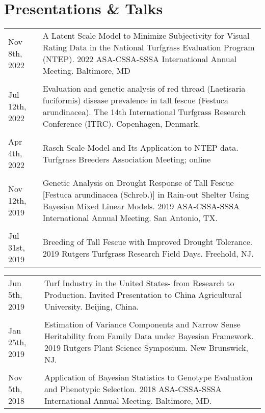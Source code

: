 \documentclass[letterpaper,11pt, english]{article}
\begin{document}
\section{Presentations \& Talks}
\begin{flushleft}
  \begin{tabularx}{\textwidth}{@{}lX@{}}
    Nov 8th, 2022 \hspace{3cm} & A Latent Scale Model to Minimize Subjectivity for Visual Rating Data in the National Turfgrass Evaluation Program (NTEP). 2022 ASA-CSSA-SSSA International Annual Meeting. Baltimore, MD \\
    \\[-0.2cm] 
    Jul 12th, 2022 \hspace{3cm} & Evaluation and genetic analysis of red thread (Laetisaria fuciformis) disease prevalence in tall fescue (Festuca arundinacea). The 14th International Turfgrass Research Conference (ITRC). Copenhagen, Denmark. \\
    \\[-0.2cm]
    Apr 4th, 2022 \hspace{3cm} & Rasch Scale Model and Its Application to NTEP data. Turfgrass Breeders Association Meeting; online \\
    \\[-0.2cm]
    Nov 12th, 2019 \hspace{3cm} & Genetic Analysis on Drought Response of Tall Fescue [Festuca arundinacea (Schreb.)] in Rain-out Shelter Using Bayesian Mixed Linear Models. 2019 ASA-CSSA-SSSA International Annual Meeting. San Antonio, TX. \\
    \\[-0.2cm]
    Jul 31st, 2019 \hspace{3cm} & Breeding of Tall Fescue with Improved Drought Tolerance. 2019 Rutgers Turfgrass Research Field Days. Freehold, NJ. \\
  \end{tabularx}
\end{flushleft}
\begin{flushleft}
    \begin{tabularx}{\textwidth}{@{}lX@{}}
    Jun 5th, 2019 \hspace{3cm} & Turf Industry in the United States- from Research to Production. Invited Presentation to China Agricultural University. Beijing, China. \\
    \\[-0.2cm]
    Jan 25th, 2019 \hspace{3cm} & Estimation of Variance Components and Narrow Sense Heritability from Family Data under Bayesian Framework. 2019 Rutgers Plant Science Symposium. New Brunswick, NJ. \\
    \\[-0.2cm]
    Nov 5th, 2018 \hspace{3cm} & Application of Bayesian Statistics to Genotype Evaluation and Phenotypic Selection. 2018 ASA-CSSA-SSSA International Annual Meeting. Baltimore, MD. \\
  \end{tabularx}
\end{flushleft}
\end{document}

